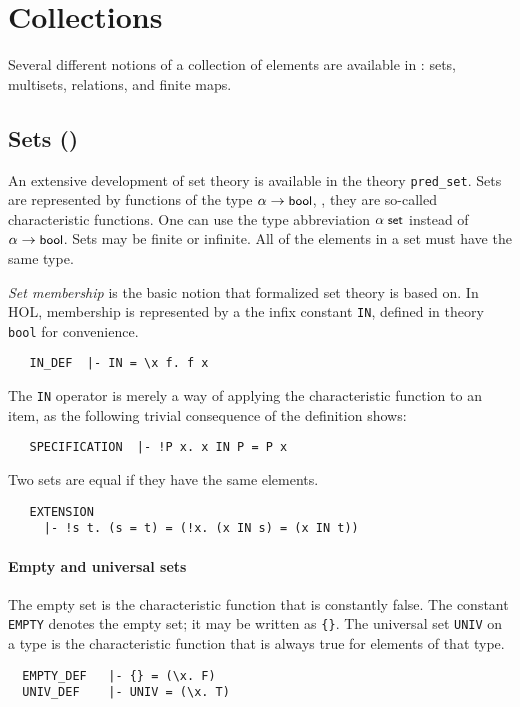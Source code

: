 \section{Collections}

Several different notions of a collection of elements are available in
\HOL: sets, multisets, relations, and finite maps.

\subsection{Sets ()}

An extensive development of set theory is available in the theory
{\small\verb+pred_set+}. Sets are represented by functions of the type
$\alpha \to \mbox{\small{\textbf{\sf{bool}}}}$, \ie, they are so-called characteristic
functions. One can use the type abbreviation $\alpha\; \mbox{\small{\textbf{\sf{set}}}}$
instead of $\alpha \to \mbox{\small{\textbf{\sf{bool}}}}$. Sets may be finite or
infinite. All of the elements in a set must have the same type.

\emph{Set membership} is the basic notion that formalized set theory
is based on. In HOL, membership is represented by a the infix constant
{\small\verb+IN+}, defined in theory {\small\verb+bool+} for
convenience.
%
{\small
\begin{verbatim}
   IN_DEF  |- IN = \x f. f x
\end{verbatim}
}
%
The {\small\verb+IN+} operator is merely a way of applying the
characteristic function to an item, as the following
trivial consequence of the definition shows:
%
{\small
\begin{verbatim}
   SPECIFICATION  |- !P x. x IN P = P x
\end{verbatim}
}
%
\noindent Two sets are equal if they have the same elements.
%
{\small
\begin{verbatim}
   EXTENSION
     |- !s t. (s = t) = (!x. (x IN s) = (x IN t))
\end{verbatim}
}

\paragraph{Empty and universal sets}

The empty set is the characteristic function that is constantly
false. The constant {\small\verb+EMPTY+} denotes the empty set; it may
be written as {\small\verb+{}+}. The universal set {\small\verb+UNIV+}
on a type is the characteristic function that is always true for
elements of that type.
%
{\small
\begin{verbatim}
  EMPTY_DEF   |- {} = (\x. F)
  UNIV_DEF    |- UNIV = (\x. T)
\end{verbatim}
}
%
